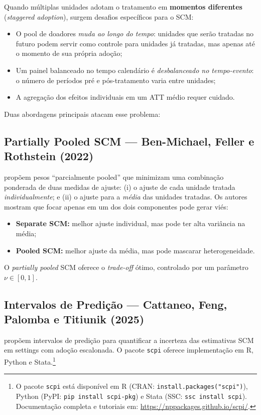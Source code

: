 \documentclass[12pt, a4paper, openany]{book}
\begin{document}
Quando múltiplas unidades adotam o tratamento em \textbf{momentos diferentes} (\textit{staggered adoption}), surgem desafios específicos para o SCM:
\begin{itemize}[leftmargin=1.5cm]
  \item O pool de doadores \textit{muda ao longo do tempo}: unidades que serão tratadas no futuro podem servir como controle para unidades já tratadas, mas apenas até o momento de sua própria adoção;
  \item Um painel balanceado no tempo calendário é \textit{desbalanceado no tempo-evento}: o número de períodos pré e pós-tratamento varia entre unidades;
  \item A agregação dos efeitos individuais em um ATT médio requer cuidado.
\end{itemize}

Duas abordagens principais atacam esse problema:

\subsection{Partially Pooled SCM --- Ben-Michael, Feller e Rothstein (2022)}

\cite{BenMichaelFellerRothstein2022} propõem pesos ``parcialmente pooled'' que minimizam uma combinação ponderada de duas medidas de ajuste: (i) o ajuste de cada unidade tratada \textit{individualmente}; e (ii) o ajuste para a \textit{média} das unidades tratadas. Os autores mostram que focar apenas em um dos dois componentes pode gerar viés:
\begin{itemize}[leftmargin=1.5cm]
  \item \textbf{Separate SCM:} melhor ajuste individual, mas pode ter alta variância na média;
  \item \textbf{Pooled SCM:} melhor ajuste da média, mas pode mascarar heterogeneidade.
\end{itemize}

O \textit{partially pooled} SCM oferece o \textit{trade-off} ótimo, controlado por um parâmetro $\nu \in [0,1]$.

\subsection{Intervalos de Predição --- Cattaneo, Feng, Palomba e Titiunik (2025)}

\cite{CattaneoFengPalombaTitiunik2025} propõem intervalos de predição para quantificar a incerteza das estimativas SCM em settings com adoção escalonada. O pacote \texttt{scpi} oferece implementação em R, Python e Stata.\footnote{O pacote \texttt{scpi} está disponível em R (CRAN: \texttt{install.packages("scpi")}), Python (PyPI: \texttt{pip install scpi-pkg}) e Stata (SSC: \texttt{ssc install scpi}). Documentação completa e tutoriais em: \url{https://nppackages.github.io/scpi/}.}
\end{document}
